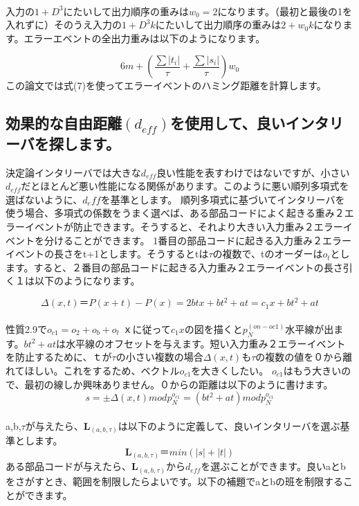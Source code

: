 \documentclass[20 pts]{article}
\begin{document}
\paragraph{}
入力の$1+D^3$にたいして出力順序の重みは$w_0=2$になります。（最初と最後の1を入れずに）そのうえ入力の$1+D^3k$にたいして出力順序の重みは$2+w_0k$になります。エラーエベントの全出力重みは以下のようになります。

\begin{equation}\tag{7}
6m+ \left( \frac{\sum \left|t_i\right|}{\tau}+\frac{\sum \left|s_i\right|}{\tau}\right)w_0
\end{equation}
この論文では式(7)を使ってエラーイベントのハミング距離を計算します。

\subsection{効果的な自由距離$(d_{eff})$を使用して、良いインタリーバを探します。}
決定論インタリーバでは大きな$d_{eff}$良い性能を表すわけではないですが、小さい$d_{eff}$だとほとんど悪い性能になる関係があります。このように悪い順列多項式を選ばないように、$d_eff$を基準とします。
順列多項式に基づいてインタリーバを使う場合、多項式の係数をうまく選べば、ある部品コードによく起きる重み２エラーイベントが防止できます。そうすると、それより大きい入力重み２エラーイベントを分けることができます。
1番目の部品コードに起きる入力重み２エラーイベントの長さをt+1とします。そうするとtは$\tau$の複数で、tのオーダーは$o_t$とします。すると、２番目の部品コードに起きる入力重み２エラーイベントの長さ引く１は以下のようになります。

\begin{equation}\tag{8}
\Delta(x,t)＝P(x+t)-P(x)=2btx+bt^2+at=c_1x+bt^2+at 
\end{equation}
\paragraph{}
性質2.9で$o_{c1}=o_2+o_b+o_t$
ｘに従って$c_1x$の図を描くと$p_N^{(on-oc1)}$水平線が出ます。$bt^2+at$は水平線のオフセットを与えます。短い入力重み２エラーイベントを防止するために、ｔが$\tau$の小さい複数の場合$\Delta(x,t)$も$\tau$の複数の値を０から離れてほしい。これをするため、ベクトル$o_{c1}$を大きくしたい。
$o_{c1}$はもう大きいので、最初の線しか興味ありません。０からの距離は以下のように書けます。
\begin{equation}\tag{9}
s=\pm \Delta(x,t) mod p_N^{o_{c1}} =( bt^2+at) mod p_N^{o_{c1}}
\end{equation}
\paragraph{}
a,b,$\tau$が与えたら、$\mathbf{L}_{(a,b,\tau)}$は以下のように定義して、良いインタリーバを選ぶ基準とします。
$$\mathbf{L}_{(a,b,\tau)}＝min⁡(|s|+|t|)$$
ある部品コードが与えたら、$\mathbf{L}_(a,b,\tau)$から$d_{eff}$を選ぶことができます。良いaとbをさがすとき、範囲を制限したらよいです。以下の補題でaとbの班を制限することができます。
\end{document}
